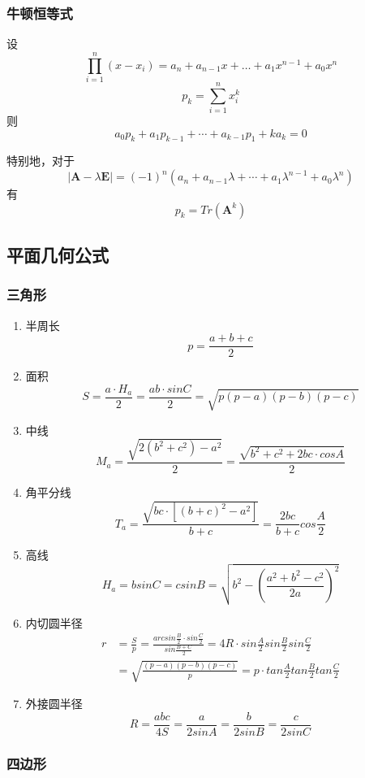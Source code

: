 \documentclass[a4paper]{article}
\begin{document}
\subsubsection{牛顿恒等式}

设$$\prod_{i = 1}^n{(x - x_i)} = a_n + a_{n - 1} x + \dots + a_1 x^{n - 1} + a_0 x^n$$
$$p_k = \sum_{i = 1}^n{x_i^k}$$
则$$a_0 p_k + a_1 p_{k - 1} + \cdots + a_{k - 1} p_1 + k a_k = 0$$

特别地，对于$$|\bm{A} - \lambda \bm{E}| = (-1)^n(a_n + a_{n - 1} \lambda + \cdots + a_1 \lambda^{n - 1} + a_0 \lambda^n)$$
有$$p_k = Tr(\bm{A}^k)$$

\subsection{平面几何公式}

\subsubsection{三角形}

\begin{enumerate}
	\item 半周长
		$$p=\frac{a+b+c}{2}$$
	\item 面积
		$$S=\frac{a \cdot H_a}{2}=\frac{ab \cdot sinC}{2}=\sqrt{p(p-a)(p-b)(p-c)}$$
	\item 中线
		$$M_a=\frac{\sqrt{2(b^2+c^2)-a^2}}{2}=\frac{\sqrt{b^2+c^2+2bc \cdot cosA}}{2}$$
	\item 角平分线 
		$$T_a=\frac{\sqrt{bc \cdot [(b+c)^2-a^2]}}{b+c}=\frac{2bc}{b+c}cos\frac{A}{2}$$
	\item 高线
		$$H_a=bsinC=csinB=\sqrt{b^2-(\frac{a^2+b^2-c^2}{2a})^2}$$
	\item 内切圆半径
		\begin{align*}
			r&=\frac{S}{p}=\frac{arcsin\frac{B}{2} \cdot sin\frac{C}{2}}{sin\frac{B+C}{2}}=4R \cdot sin\frac{A}{2}sin\frac{B}{2}sin\frac{C}{2}\\
			&=\sqrt{\frac{(p-a)(p-b)(p-c)}{p}}=p \cdot tan\frac{A}{2}tan\frac{B}{2}tan\frac{C}{2}
		\end{align*}
	\item 外接圆半径
		$$R=\frac{abc}{4S}=\frac{a}{2sinA}=\frac{b}{2sinB}=\frac{c}{2sinC}$$
\end{enumerate}

\subsubsection{四边形}
\end{document}
